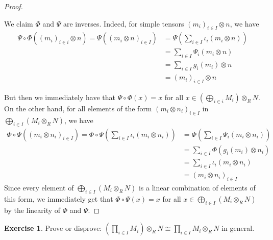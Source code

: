 \documentclass[11pt]{book}
\newcounter{counter}
\theoremstyle{definition}   \newtheorem{defn}[counter]{Definition} %
\newtheorem{exercise}[counter]{Exercise}
\newcommand{\vs}{\vspace{8pt}}   \newcommand{\hs}{\hspace{8pt}}
\numberwithin{counter}{chapter}
\begin{document}
\begin{proof}
\begin{enumerate}
\end{enumerate}

\vs

We claim $\Phi$ and $\Psi$ are inverses. Indeed, for simple tensors $(m_i)_{i \in I} \otimes n$, we have
\begin{align*}
\Psi \circ \Phi ((m_i)_{i \in i} \otimes n) = \Psi ((m_i \otimes n)_{i \in I}) &= \Psi \left( \sum_{i \in I} \iota_i (m_i \otimes n)\right) \tag{finite sum} \\
&= \sum_{i \in I} \Psi_i(m_i \otimes n) \\
&= \sum_{i \in I} g_i(m_i) \otimes n \\
&= (m_i)_{i \in I} \otimes n
\end{align*}

But then we immediately have that $\Psi \circ \Phi(x) = x$ for all $x \in \left(\bigoplus_{i \in i} M_i\right) \otimes_R N$. On the other hand, for all elements of the form $(m_i \otimes n_i)_{i \in I} $ in $ \bigoplus_{i \in I} (M_i \otimes_R N)$, we have
\begin{align*}
\Phi \circ \Psi ((m_i \otimes n_i)_{i \in I}) = \Phi \circ \Psi \left(\sum_{i \in I} \iota_i (m_i \otimes n_i) \right) &= \Phi \left(\sum_{i \in I} \Psi_i(m_i \otimes n_i) \right) \\
&= \sum_{i \in I} \Phi (g_i(m_i) \otimes n_i) \\
&= \sum_{i \in I} \iota_i(m_i \otimes n_i) \\
&= (m_i \otimes n_i)_{i \in I} 
\end{align*}
Since every element of $\bigoplus_{i \in I} (M_i \otimes_R N)$ is a linear combination of elements of this form, we immediately get that $\Phi \circ \Psi (x) = x$ for all $x \in \bigoplus_{i \in I} (M_i \otimes_R N)$ by the linearity of $\Phi$ and $\Psi$. 
\end{proof}

\vs

\begin{exercise}
Prove or disprove: $\left(\prod_{i \in I} M_i\right) \otimes_R N \cong \prod_{i \in I} M_i \otimes_R N$ in general. 
\end{exercise}
\end{document}
